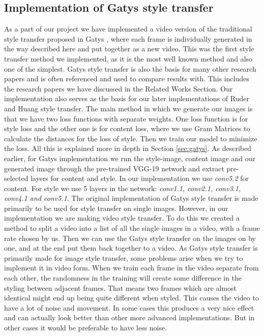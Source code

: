 \subsection{Implementation of Gatys style transfer}
As a part of our project we have implemented a video version of the traditional style transfer proposed in Gatys \cite{Gatys:1}, where each frame is individually generated in the way described here and put together as a new video.\newline\newline
This was the first style transfer method we implemented, as it is the most well known method and also one of the simplest. Gatys style transfer is also the basis for many other research papers and is often referenced and used to compare results with. This includes the research papers we have discussed in the Related Works Section. Our implementation also serves as the basis for our later implementations of Ruder \cite{Ruder:1} and Huang \cite{Huang:1} style transfer.  \newline\newline
The main method in which we generate our images is that we have two loss functions with separate weights. One loss function is for style loss and the other one is for content loss, where we use Gram Matrices to calculate the distances for the loss of style. Then we train our model to minimize the loss. All this is explained more in depth in Section \ref{sec:gatys}.\newline\newline
As described earlier, for Gatys implementation we run the style-image, content image and our generated image through the pre-trained VGG-19 network and extract pre-selected layers for content and style. In our implementation we use \textit{conv5.2} for content. For style we use 5 layers in the network: \textit{conv1.1, conv2.1, conv3.1, conv4.1 and conv5.1}.\newline\newline
The original implementation of Gatys style transfer is made primarily to be used for style transfer on single images. However, in our implementation we are making video style transfer. To do this we created a method to split a video into a list of all the single images in a video, with a frame rate chosen by us. Then we can use the Gatys style transfer on the images on by one, and at the end put them back together to a video.\newline\newline
As Gatys style transfer is primarily made for image style transfer, some problems arise when we try to implement it in video form. When we train each frame in the video separate from each other, the randomness in the training will create some difference in the styling between adjacent frames. That means two frames which are almost identical might end up being quite different when styled. This causes the video to have a lot of noise and movement. In some cases this produces a very nice effect and can actually look better than other more advanced implementations. But in other cases it would be preferable to have less noise.
